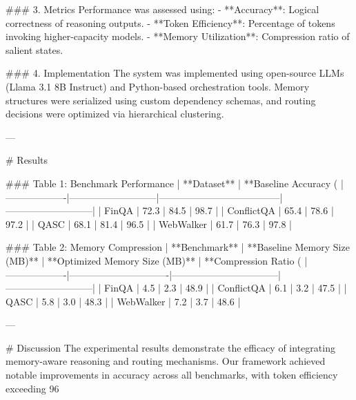 ### 3. Metrics  
Performance was assessed using:  
- **Accuracy**: Logical correctness of reasoning outputs.  
- **Token Efficiency**: Percentage of tokens invoking higher-capacity models.  
- **Memory Utilization**: Compression ratio of salient states.  

### 4. Implementation  
The system was implemented using open-source LLMs (Llama 3.1 8B Instruct) and Python-based orchestration tools. Memory structures were serialized using custom dependency schemas, and routing decisions were optimized via hierarchical clustering.

---

# Results  

### Table 1: Benchmark Performance  
| **Dataset**      | **Baseline Accuracy (%
|-------------------|---------------------------|--------------------------------------|---------------------------|  
| FinQA            | 72.3                      | 84.5                               | 98.7                      |  
| ConflictQA       | 65.4                      | 78.6                               | 97.2                      |  
| QASC             | 68.1                      | 81.4                               | 96.5                      |  
| WebWalker        | 61.7                      | 76.3                               | 97.8                      |  

### Table 2: Memory Compression  
| **Benchmark**     | **Baseline Memory Size (MB)** | **Optimized Memory Size (MB)** | **Compression Ratio (%
|-------------------|-------------------------------|---------------------------------|---------------------------|  
| FinQA            | 4.5                          | 2.3                           | 48.9                      |  
| ConflictQA       | 6.1                          | 3.2                           | 47.5                      |  
| QASC             | 5.8                          | 3.0                           | 48.3                      |  
| WebWalker        | 7.2                          | 3.7                           | 48.6                      |  

---

# Discussion  
The experimental results demonstrate the efficacy of integrating memory-aware reasoning and routing mechanisms. Our framework achieved notable improvements in accuracy across all benchmarks, with token efficiency exceeding 96%

